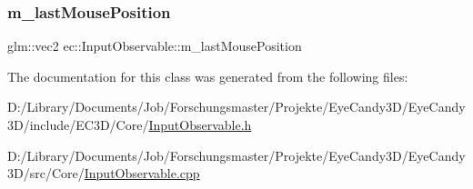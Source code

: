 \subsubsection{\texorpdfstring{m\+\_\+last\+Mouse\+Position}{m\_lastMousePosition}}
{\footnotesize\ttfamily glm\+::vec2 ec\+::\+Input\+Observable\+::m\+\_\+last\+Mouse\+Position\hspace{0.3cm}{\ttfamily [protected]}}



The documentation for this class was generated from the following files\+:\begin{DoxyCompactItemize}
\item 
D\+:/\+Library/\+Documents/\+Job/\+Forschungsmaster/\+Projekte/\+Eye\+Candy3\+D/\+Eye\+Candy3\+D/include/\+E\+C3\+D/\+Core/\mbox{\hyperlink{_input_observable_8h}{Input\+Observable.\+h}}\item 
D\+:/\+Library/\+Documents/\+Job/\+Forschungsmaster/\+Projekte/\+Eye\+Candy3\+D/\+Eye\+Candy3\+D/src/\+Core/\mbox{\hyperlink{_input_observable_8cpp}{Input\+Observable.\+cpp}}\end{DoxyCompactItemize}
